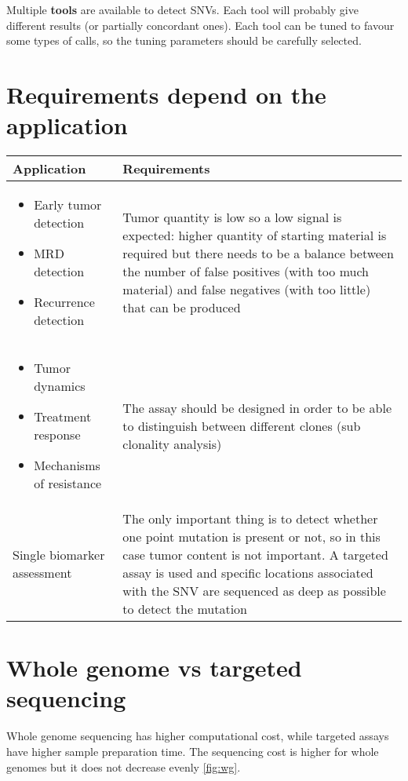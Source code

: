 Multiple \textbf{tools} are available to detect SNVs. Each tool will probably give different results (or partially concordant ones). Each tool can be tuned to favour some types of calls, so the tuning parameters should be carefully selected.

\section{Requirements depend on the application}

\begin{tabular}{ | m{5cm}| m{9cm} | }
 \hline
 \textbf{Application} & \textbf{Requirements} \\
 \hline
 \begin{itemize}
     \item Early tumor detection
     \item MRD detection
     \item Recurrence detection
 \end{itemize} & Tumor quantity is low so a low signal is expected: higher quantity of starting material is required but there needs to be a balance between the number of false positives (with too much material) and false negatives (with too little) that can be produced \\
 \hline
 \begin{itemize}
     \item Tumor dynamics
     \item Treatment response
     \item Mechanisms of resistance
 \end{itemize} & The assay should be designed in order to be able to distinguish between different clones (sub clonality analysis) \\
 \hline
 Single biomarker assessment & The only important thing is to detect whether one point mutation is present or not, so in this case tumor content is not important. A targeted assay is used and specific locations associated with the SNV are sequenced as deep as possible to detect the mutation \\
 \hline
\end{tabular}

\section{Whole genome vs targeted sequencing}
Whole genome sequencing has higher computational cost, while targeted assays have higher sample preparation time. The sequencing cost is higher for whole genomes but it does not decrease evenly \ref{fig:wg}.

